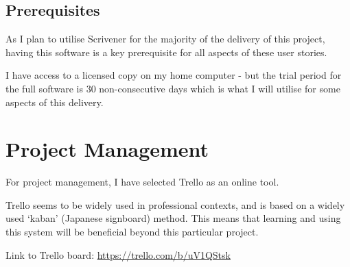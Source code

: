 \documentclass{article}
\begin{document}
\subsection{Prerequisites}


As I plan to utilise Scrivener for the majority of the delivery of this project, having this software is a key prerequisite for all aspects of these user stories. 

I have access to a licensed copy on my home computer - but the trial period for the full software is 30 non-consecutive days which is what I will utilise for some aspects of this delivery. 

\section{Project Management}

For project management, I have selected Trello as an online tool.

Trello seems to be widely used in professional contexts, and is based on a widely used `kaban' (Japanese signboard) method. This means that learning and using this system will be beneficial beyond this particular project.

Link to Trello board: \href{https://trello.com/b/uV1QStsk}{https://trello.com/b/uV1QStsk}
\end{document}
